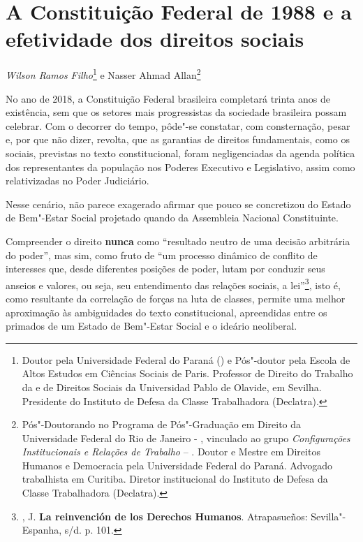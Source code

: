 \chapter*{A Constituição Federal de 1988 e a efetividade dos direitos sociais}


\begin{flushright}
\emph{Wilson Ramos Filho}\footnote{Doutor pela Universidade Federal do
  Paraná () e Pós"-doutor pela Escola de Altos Estudos em Ciências
  Sociais de Paris. Professor de Direito do Trabalho da  e de
  Direitos Sociais da Universidad Pablo de Olavide, em Sevilha.
  Presidente do Instituto de Defesa da Classe Trabalhadora (Declatra).}
e Nasser Ahmad Allan\footnote{Pós"-Doutorando no Programa de Pós"-Graduação
  em Direito da Universidade Federal do Rio de Janeiro - , vinculado
  ao grupo \emph{Configurações Institucionais e Relações de Trabalho} --
  . Doutor e Mestre em Direitos Humanos e Democracia pela
  Universidade Federal do Paraná. Advogado trabalhista em Curitiba.
  Diretor institucional do Instituto de Defesa da Classe Trabalhadora
  (Declatra).}
\end{flushright}

No ano de 2018, a Constituição Federal brasileira completará trinta anos
de existência, sem que os setores mais progressistas da sociedade
brasileira possam celebrar. Com o decorrer do tempo, pôde"-se constatar,
com consternação, pesar e, por que não dizer, revolta, que as garantias
de direitos fundamentais, como os sociais, previstas no texto
constitucional, foram negligenciadas da agenda política dos
representantes da população nos Poderes Executivo e Legislativo, assim
como relativizadas no Poder Judiciário.

Nesse cenário, não parece exagerado afirmar que pouco se concretizou do
Estado de Bem"-Estar Social projetado quando da Assembleia Nacional
Constituinte.

Compreender o direito \textbf{nunca} como ``resultado neutro de uma
decisão arbitrária do poder'', mas sim, como fruto de ``um processo
dinâmico de conflito de interesses que, desde diferentes posições de
poder, lutam por conduzir seus anseios e valores, ou seja, seu
entendimento das relações sociais, a lei''\footnote{, J.
  \textbf{La reinvención de los Derechos Humanos}. Atrapasueños:
  Sevilla"-Espanha, s/d. p. 101.}, isto é, como resultante da correlação
de forças na luta de classes, permite uma melhor aproximação às
ambiguidades do texto constitucional, apreendidas entre os primados de
um Estado de Bem"-Estar Social e o ideário neoliberal.

